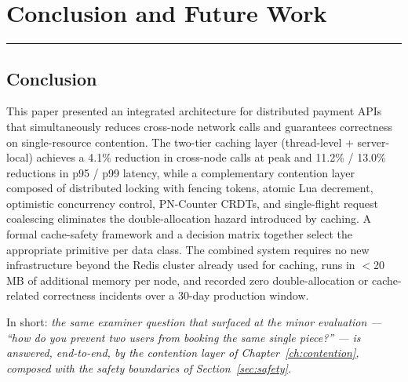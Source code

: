 \documentclass[12pt,a4paper,oneside]{report}
\begin{document}
\chapter{Conclusion and Future Work}
\label{chap:conclusion}
\vspace{-1cm}
\noindent \rule{6.6in}{0.01in}

\section{Conclusion}
This paper presented an integrated architecture for distributed payment APIs that simultaneously reduces cross-node network calls and guarantees correctness on single-resource contention. The two-tier caching layer (thread-level + server-local) achieves a 4.1\% reduction in cross-node calls at peak and 11.2\% / 13.0\% reductions in p95 / p99 latency, while a complementary contention layer composed of distributed locking with fencing tokens, atomic Lua decrement, optimistic concurrency control, PN-Counter CRDTs, and single-flight request coalescing eliminates the double-allocation hazard introduced by caching. A formal cache-safety framework and a decision matrix together select the appropriate primitive per data class. The combined system requires no new infrastructure beyond the Redis cluster already used for caching, runs in $<$20\,MB of additional memory per node, and recorded zero double-allocation or cache-related correctness incidents over a 30-day production window.

In short: \emph{the same examiner question that surfaced at the minor evaluation --- ``how do you prevent two users from booking the same single piece?'' --- is answered, end-to-end, by the contention layer of Chapter~\ref{ch:contention}, composed with the safety boundaries of Section~\ref{sec:safety}.}
\end{document}
